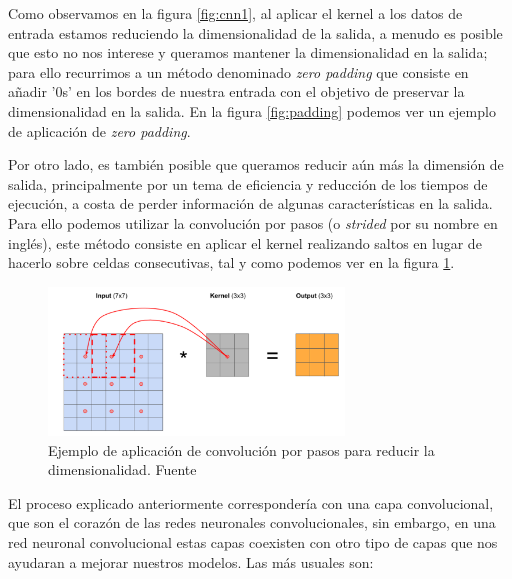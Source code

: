Como observamos en la figura \ref{fig:cnn1}, al aplicar el kernel a los datos de  entrada estamos reduciendo la dimensionalidad de la salida, a menudo es posible que esto no nos interese y queramos mantener la dimensionalidad en la salida; para ello recurrimos a un método denominado \textit{zero padding} que consiste en añadir '0s' en los bordes de nuestra entrada con el objetivo de preservar la dimensionalidad en la salida. En la figura \ref{fig:padding} podemos ver un ejemplo de aplicación de \textit{zero padding}.




Por otro lado, es también posible que queramos reducir aún más la dimensión de salida, principalmente por un tema de eficiencia y reducción de los tiempos de ejecución, a costa de perder información de algunas características en la salida. Para ello podemos utilizar la convolución por pasos (o \textit{strided} por su nombre en inglés), este método consiste en aplicar el kernel realizando saltos en lugar de hacerlo sobre celdas consecutivas,  tal y como podemos ver en la figura \ref{fig:strided}.

\begin{figure}[!ht]
	\centering
	\includegraphics[width=0.7\textwidth]{images/arte/strided}
	\caption{Ejemplo de aplicación de convolución por pasos para reducir la dimensionalidad. Fuente \cite{temariodeeplearning}}
	\label{fig:strided}
\end{figure}



El proceso explicado anteriormente correspondería con una capa convolucional, que son el corazón de las redes neuronales convolucionales, sin embargo, en una red neuronal convolucional estas capas coexisten con otro tipo de capas que nos ayudaran a mejorar nuestros modelos. Las más usuales son:

